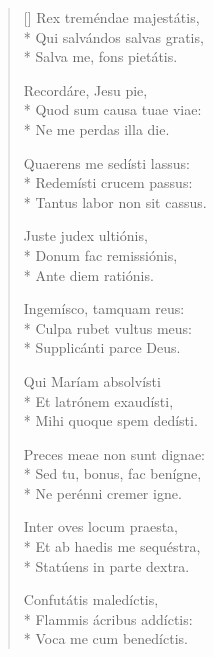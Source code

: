 \begin{multicols}{2}
\begin{flushleft}
\begin{verse}[\versewidth]
Rex treméndae majestátis,       \\*
Qui salvándos salvas gratis,    \\*
Salva me, fons pietátis.        
                                
Recordáre, Jesu pie,            \\*
Quod sum causa tuae viae:       \\*
Ne me perdas illa die.          
                                
Quaerens me sedísti lassus:     \\*
Redemísti crucem passus:        \\*
Tantus labor non sit cassus.    
                                
                                
Juste judex ultiónis,           \\*
Donum fac remissiónis,          \\*
Ante diem ratiónis.             
                                
Ingemísco, tamquam reus:        \\*
Culpa rubet vultus meus:        \\*
Supplicánti parce Deus.         
                                
                                
                                
                                
                                
                                
Qui Maríam absolvísti     \\*
Et latrónem exaudísti,          \\*
Mihi quoque spem dedísti.       
                                
Preces meae non sunt dignae:    \\*
Sed tu, bonus, fac benígne,     \\*
Ne perénni cremer igne.         
                                
Inter oves locum praesta,       \\*
Et ab haedis me sequéstra,      \\*
Statúens in parte dextra.       
                                
Confutátis maledíctis,          \\*
Flammis ácribus addíctis:       \\*
Voca me cum benedíctis.         
                                

\end{verse}
\end{flushleft}
\end{multicols}
